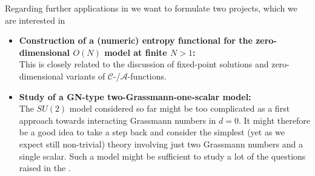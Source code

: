 Regarding further applications in \dzero{} we want to formulate two projects, which we are interested in
\begin{itemize}
	\item\textbf{Construction of a (numeric) entropy functional for the zero-dimensional $O(N)$ model at finite $N>1$:}\\
	This is closely related to the discussion of fixed-point solutions and zero-dimensional variants of $\mathcal{C}$-/$\mathcal{A}$-functions.
	\item\textbf{Study of a GN-type two-Grassmann-one-scalar model:}\\
	The $SU(2)$ model considered so far might be too complicated as a first approach towards interacting Grassmann numbers in $d=0$.
	It might therefore be a good idea to take a step back and consider the simplest (yet as we expect still non-trivial) theory involving just two Grassmann numbers and a single scalar.
	Such a model might be sufficient to study a lot of the questions raised in the .
\end{itemize}